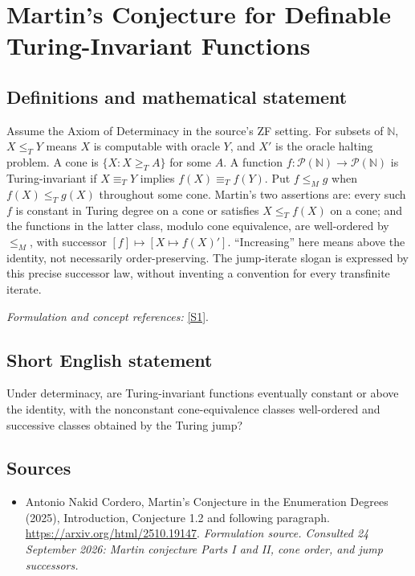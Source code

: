 \documentclass[11pt]{article}
\begin{document}
\section*{\texorpdfstring{Martin's Conjecture for Definable Turing-Invariant Functions}{Martin's Conjecture for Definable Turing-Invariant Functions}}\label{415}
\subsection{Definitions and mathematical statement}
Assume the Axiom of Determinacy in the source's ZF setting. For subsets of ${\mathbb{N}}$, $X\le_TY$ means $X$ is computable with oracle $Y$, and $X'$ is the oracle halting problem. A cone is $\{X:X\ge_TA\}$ for some $A$. A function $f:\mathcal P({\mathbb{N}})\to\mathcal P({\mathbb{N}})$ is Turing-invariant if $X\equiv_TY$ implies $f(X)\equiv_Tf(Y)$. Put $f\le_Mg$ when $f(X)\le_Tg(X)$ throughout some cone. Martin's two assertions are: every such $f$ is constant in Turing degree on a cone or satisfies $X\le_Tf(X)$ on a cone; and the functions in the latter class, modulo cone equivalence, are well-ordered by $\le_M$, with successor $[f]\mapsto[X\mapsto f(X)']$. ``Increasing'' here means above the identity, not necessarily order-preserving. The jump-iterate slogan is expressed by this precise successor law, without inventing a convention for every transfinite iterate.
\par\smallskip\textit{Formulation and concept references:} \href{https://arxiv.org/html/2510.19147}{[S1]}.

\subsection{Short English statement}
Under determinacy, are Turing-invariant functions eventually constant or above the identity, with the nonconstant cone-equivalence classes well-ordered and successive classes obtained by the Turing jump?
\subsection{Sources}
\begin{itemize}
\item[S1]Antonio Nakid Cordero, Martin's Conjecture in the Enumeration Degrees (2025), Introduction, Conjecture 1.2 and following paragraph.
\url{https://arxiv.org/html/2510.19147}.
\textit{Formulation source. Consulted 24 September 2026: Martin conjecture Parts I and II, cone order, and jump successors.}
\end{itemize}
\end{document}

